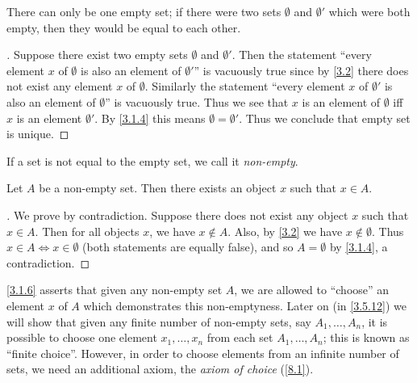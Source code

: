\begin{ac}\label{ac:3.1.2}
  There can only be one empty set;
  if there were two sets \(\emptyset\) and \(\emptyset'\) which were both empty, then they would be equal to each other.
\end{ac}

\begin{proof}[]
  Suppose there exist two empty sets \(\emptyset\) and \(\emptyset'\).
  Then the statement ``every element \(x\) of \(\emptyset\) is also an element of \(\emptyset'\)'' is vacuously true since by \cref{3.2} there does not exist any element \(x\) of \(\emptyset\).
  Similarly the statement ``every element \(x\) of \(\emptyset'\) is also an element of \(\emptyset\)'' is vacuously true.
  Thus we see that \(x\) is an element of \(\emptyset\) iff \(x\) is an element \(\emptyset'\).
  By \cref{3.1.4} this means \(\emptyset = \emptyset'\).
  Thus we conclude that empty set is unique.
\end{proof}

\begin{note}
  If a set is not equal to the empty set, we call it \emph{non-empty}.
\end{note}

\setcounter{thm}{5}
\begin{lem}\label{3.1.6}
  Let \(A\) be a non-empty set.
  Then there exists an object \(x\) such that \(x \in A\).
\end{lem}

\begin{proof}[]
  We prove by contradiction.
  Suppose there does not exist any object \(x\) such that \(x \in A\).
  Then for all objects \(x\), we have \(x \notin A\).
  Also, by \cref{3.2} we have \(x \notin \emptyset\).
  Thus \(x \in A \iff x \in \emptyset\) (both statements are equally false), and so \(A = \emptyset\) by \cref{3.1.4}, a contradiction.
\end{proof}

\begin{rmk}\label{3.1.7}
  \cref{3.1.6} asserts that given any non-empty set \(A\), we are allowed to ``choose'' an element \(x\) of \(A\) which demonstrates this non-emptyness.
  Later on (in \cref{3.5.12}) we will show that given any finite number of non-empty sets, say \(A_1, \dots, A_n\), it is possible to choose one element \(x_1, \dots, x_n\) from each set \(A_1, \dots, A_n\);
  this is known as ``finite choice''.
  However, in order to choose elements from an infinite number of sets, we need an additional axiom, the \emph{axiom of choice} (\cref{8.1}).
\end{rmk}

